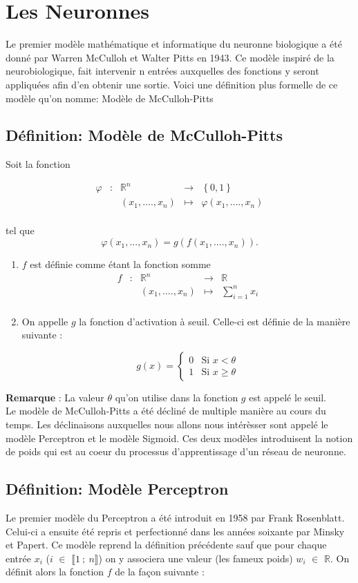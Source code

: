 \documentclass{article}
\newcommand{\fonction}[5]{
	\begin{array}{ccccc}
#1 & : & #2 & \to & #3\\
	& & #4 & \mapsto & #5\\ 
	\end{array}
}
\begin{document}
\section[Titre plus court]{Les Neuronnes}

Le premier modèle mathématique et informatique du neuronne biologique a été donné par Warren McCulloh et Walter Pitts en 1943.
Ce modèle inspiré de la neurobiologique, fait intervenir n entrées auxquelles des fonctions y seront appliquées afin d'en obtenir une sortie.
Voici une définition plus formelle de ce modèle qu'on nomme: Modèle de McCulloh-Pitts     

\subsection{Définition: Modèle de McCulloh-Pitts}
	Soit la fonction  

	\[\fonction{\varphi}{\mathbb{R}^n}{\left\{0,1\right\}}{(x_1,....,x_n)}{\varphi(x_1,....,x_n)} \]

	tel que  
	\[\varphi (x_1,...,x_n) = g(f(x_1,....,x_n)). \]  

	\begin{enumerate}
		\item $f$ est définie comme étant la fonction somme 
		\[\fonction{f}{\mathbb{R}^n}{\mathbb{R}}{(x_1,....,x_n)}{\sum_{i=1}^{n} {x_i}} \] 
		\item On appelle $g$ la fonction d'activation à seuil. Celle-ci est définie de la manière suivante :

		\[g(x) = \begin{cases} 0 &\mbox{Si } x < \theta \\
				 1 & \mbox{Si } x \geq \theta
	 		 \end{cases} 
		\]
	\end{enumerate}
	
	\textbf{Remarque} : La valeur $\theta$  qu'on utilise dans la fonction $g$ est appelé le seuil.\\
	

Le modèle de McCulloh-Pitts a été décliné de multiple manière au cours du temps. Les déclinaisons auxquelles nous allons nous intérèsser sont appelé le modèle Perceptron et le modèle Sigmoid. Ces deux modèles introduisent la notion de poids qui est au coeur du processus d'apprentissage d'un réseau de neuronne. 

	\subsection{Définition: Modèle Perceptron}
		Le premier modèle du Perceptron a été introduit en 1958 par Frank Rosenblatt. Celui-ci a ensuite été repris et perfectionné dans les années soixante par Minsky et Papert. Ce modèle reprend la définition précédente sauf que pour chaque entrée $x_i$ ($i$ $\in$ $\llbracket 1~;~n \rrbracket$) on y associera une valeur (les fameux poids) $w_i$ $\in$ $\mathbb{R}$. 
		On définit alors la fonction $f$ de la façon suivante : 
		
\end{document}
